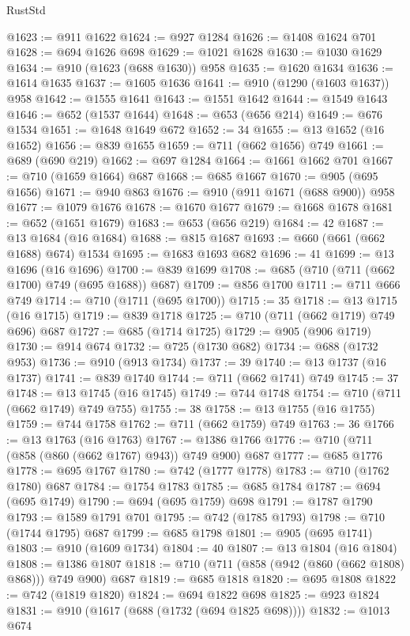 \begin{lexlean}{RustStd}
\begin{coremodule}
{\begin{coremodule}
{{{{{{{{{{{{{{{{{{{{@1623 := @911 @1622
@1624 := @927 @1284
@1626 := @1408 @1624 @701
@1628 := @694 @1626 @698
@1629 := @1021 @1628
@1630 := @1030 @1629
@1634 := @910 (@1623 (@688 @1630)) @958
@1635 := @1620 @1634
@1636 := @1614 @1635
@1637 := @1605 @1636
@1641 := @910 (@1290 (@1603 @1637)) @958
@1642 := @1555 @1641
@1643 := @1551 @1642
@1644 := @1549 @1643
@1646 := @652 (@1537 @1644)
@1648 := @653 (@656 @214)
@1649 := @676 @1534
@1651 := @1648 @1649 @672
@1652 := 34
@1655 := @13 @1652 (@16 @1652)
@1656 := @839 @1655
@1659 := @711 (@662 @1656) @749
@1661 := @689 (@690 @219)
@1662 := @697 @1284
@1664 := @1661 @1662 @701
@1667 := @710 (@1659 @1664) @687
@1668 := @685 @1667
@1670 := @905 (@695 @1656)
@1671 := @940 @863
@1676 := @910 (@911 @1671 (@688 @900)) @958
@1677 := @1079 @1676
@1678 := @1670 @1677
@1679 := @1668 @1678
@1681 := @652 (@1651 @1679)
@1683 := @653 (@656 @219)
@1684 := 42
@1687 := @13 @1684 (@16 @1684)
@1688 := @815 @1687
@1693 := @660 (@661 (@662 @1688) @674) @1534
@1695 := @1683 @1693 @682
@1696 := 41
@1699 := @13 @1696 (@16 @1696)
@1700 := @839 @1699
@1708 := @685 (@710 (@711 (@662 @1700) @749 (@695 @1688)) @687)
@1709 := @856 @1700
@1711 := @711 @666 @749
@1714 := @710 (@1711 (@695 @1700))
@1715 := 35
@1718 := @13 @1715 (@16 @1715)
@1719 := @839 @1718
@1725 := @710 (@711 (@662 @1719) @749 @696) @687
@1727 := @685 (@1714 @1725)
@1729 := @905 (@906 @1719)
@1730 := @914 @674
@1732 := @725 (@1730 @682)
@1734 := @688 (@1732 @953)
@1736 := @910 (@913 @1734)
@1737 := 39
@1740 := @13 @1737 (@16 @1737)
@1741 := @839 @1740
@1744 := @711 (@662 @1741) @749
@1745 := 37
@1748 := @13 @1745 (@16 @1745)
@1749 := @744 @1748
@1754 := @710 (@711 (@662 @1749) @749 @755)
@1755 := 38
@1758 := @13 @1755 (@16 @1755)
@1759 := @744 @1758
@1762 := @711 (@662 @1759) @749
@1763 := 36
@1766 := @13 @1763 (@16 @1763)
@1767 := @1386 @1766
@1776 := @710 (@711 (@858 (@860 (@662 @1767) @943)) @749 @900) @687
@1777 := @685 @1776
@1778 := @695 @1767
@1780 := @742 (@1777 @1778)
@1783 := @710 (@1762 @1780) @687
@1784 := @1754 @1783
@1785 := @685 @1784
@1787 := @694 (@695 @1749)
@1790 := @694 (@695 @1759) @698
@1791 := @1787 @1790
@1793 := @1589 @1791 @701
@1795 := @742 (@1785 @1793)
@1798 := @710 (@1744 @1795) @687
@1799 := @685 @1798
@1801 := @905 (@695 @1741)
@1803 := @910 (@1609 @1734)
@1804 := 40
@1807 := @13 @1804 (@16 @1804)
@1808 := @1386 @1807
@1818 := @710 (@711 (@858 (@942 (@860 (@662 @1808) @868))) @749 @900) @687
@1819 := @685 @1818
@1820 := @695 @1808
@1822 := @742 (@1819 @1820)
@1824 := @694 @1822 @698
@1825 := @923 @1824
@1831 := @910 (@1617 (@688 (@1732 (@694 @1825 @698))))
@1832 := @1013 @674
}}}}}}}}}}}}}}}}}}}}
\end{coremodule}}
\end{coremodule}
\end{lexlean}
